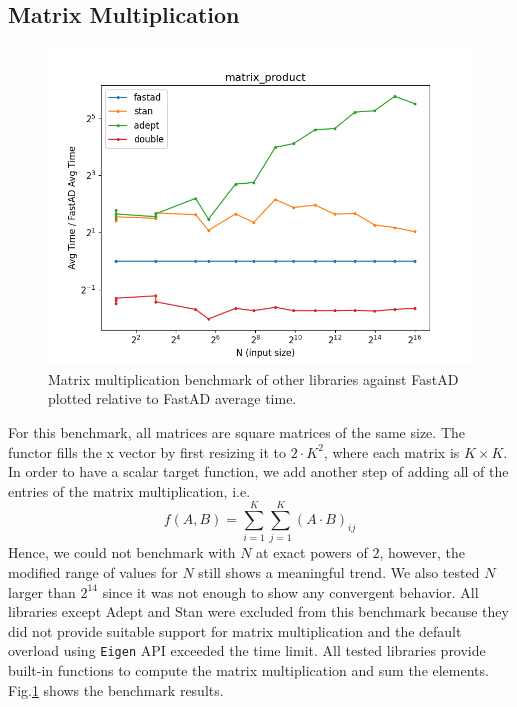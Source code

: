 \subsection{Matrix Multiplication}

\begin{figure}[t]
    \centering
    \includegraphics[width=\textwidth]{figs/matrix_product_fig.png}
    \caption{%
        Matrix multiplication benchmark of other libraries against FastAD 
        plotted relative to FastAD average time.
    }\label{fig:matrix_mult}
\end{figure}

For this benchmark, all matrices are square matrices of the same size.
The functor fills the x vector by first resizing it to $2 \cdot K^2$,
where each matrix is $K\times K$.
In order to have a scalar target function,
we add another step of adding all of the entries of the matrix multiplication, i.e.
\[
    f(A, B) = \sum\limits_{i=1}^{K} \sum\limits_{j=1}^{K} {(A \cdot B)}_{ij}
\]
Hence, we could not benchmark with $N$ at exact powers of $ 2$,
however, the modified range of values for $N$ still shows a meaningful trend.
We also tested $N$ larger than $2^{14}$ since it was not enough to show any convergent behavior.
All libraries except Adept and Stan were excluded from this benchmark
because they did not provide suitable support for matrix multiplication
and the default overload using \verb|Eigen| API exceeded the time limit.
All tested libraries provide built-in functions to 
compute the matrix multiplication and sum the elements.
Fig.\ref{fig:matrix_mult} shows the benchmark results.

